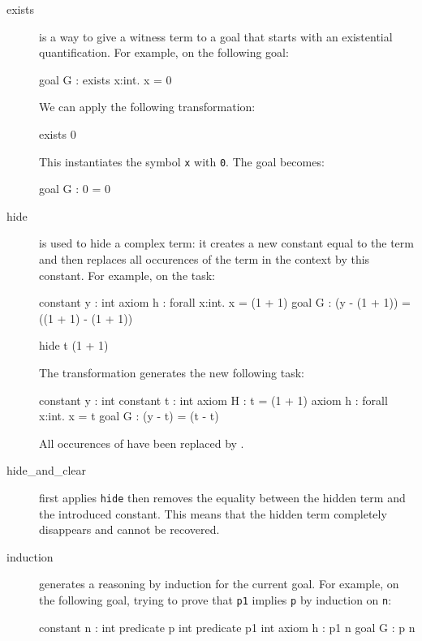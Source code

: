 \begin{description}

\item[exists] is a way to give a witness term to a goal that starts with an
  existential quantification.
  For example, on the following goal:
\begin{whycode}
goal G : exists x:int. x = 0
\end{whycode}
We can apply the following transformation:

\begin{transwhy3}
exists 0
\end{transwhy3}

This instantiates the symbol \texttt{x} with \texttt{0}. The goal becomes:

\begin{whycode}
goal G : 0 = 0
\end{whycode}


\item[hide] is used to hide a complex term: it creates a new constant equal to
  the term and then replaces all occurences of the term in the context by this
  constant.
  For example, on the task:
\begin{whycode}
constant y : int
axiom h : forall x:int. x = (1 + 1)
goal G : (y - (1 + 1)) = ((1 + 1) - (1 + 1))
\end{whycode}

\begin{transwhy3}
hide t (1 + 1)
\end{transwhy3}

The transformation generates the new following task:
\begin{whycode}
constant y : int
constant t : int
axiom H : t = (1 + 1)
axiom h : forall x:int. x = t
goal G : (y - t) = (t - t)
\end{whycode}

All occurences of  have been replaced by .


\item[hide\_and\_clear] first applies \texttt{hide} then removes the
  equality between the hidden term and the introduced constant. This means that
  the hidden term completely disappears and cannot be recovered.


\item[induction] generates a reasoning by induction for the current goal.
  For example, on the following goal, trying to prove that \texttt{p1} implies
  \texttt{p} by induction on \texttt{n}:
\begin{whycode}
constant n : int
predicate p int
predicate p1 int
axiom h : p1 n
goal G : p n
\end{whycode}


\end{description}
